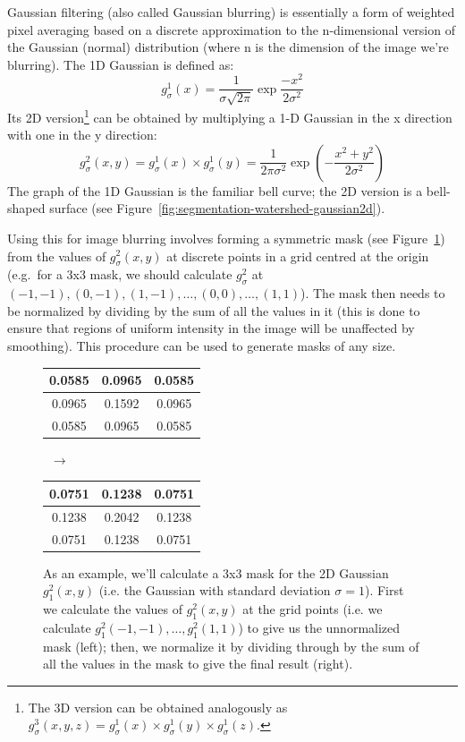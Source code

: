 Gaussian filtering (also called Gaussian blurring) is essentially a form of weighted pixel averaging based on a discrete approximation to the n-dimensional version of the Gaussian (normal) distribution (where n is the dimension of the image we're blurring). The 1D Gaussian is defined as:
%
\[
g_\sigma^1(x) = \frac{1}{\sigma\sqrt{2\pi}} \exp \frac{-x^2}{2\sigma^2}
\]
%
Its 2D version\footnote{The 3D version can be obtained analogously as $g_\sigma^3(x,y,z) = g_\sigma^1(x) \times g_\sigma^1(y) \times g_\sigma^1(z)$.} can be obtained by multiplying a 1-D Gaussian in the x direction with one in the y direction:
%
\[
g_\sigma^2(x,y) = g_\sigma^1(x) \times g_\sigma^1(y) = \frac{1}{2\pi\sigma^2} \exp \left( -\frac{x^2+y^2}{2\sigma^2} \right)
\]
%
The graph of the 1D Gaussian is the familiar bell curve; the 2D version is a bell-shaped surface (see Figure~\ref{fig:segmentation-watershed-gaussian2d}).


Using this for image blurring involves forming a symmetric mask (see Figure~\ref{fig:segmentation-watershed-gaussianmask}) from the values of $g_\sigma^2(x,y)$ at discrete points in a grid centred at the origin (e.g.~for a 3x3 mask, we should calculate $g_\sigma^2$ at $(-1,-1), (0,-1), (1,-1), \ldots, (0,0), \ldots, (1,1)$). The mask then needs to be normalized by dividing by the sum of all the values in it (this is done to ensure that regions of uniform intensity in the image will be unaffected by smoothing). This procedure can be used to generate masks of any size.

\begin{figure}[t]
\begin{center}
\begin{tabular}{|c|c|c|}
\hline
0.0585 & 0.0965 & 0.0585 \\
\hline
0.0965 & 0.1592 & 0.0965 \\
\hline
0.0585 & 0.0965 & 0.0585 \\
\hline
\end{tabular}%
$\;\; \longrightarrow \;\;$%
\begin{tabular}{|c|c|c|}
\hline
0.0751 & 0.1238 & 0.0751 \\
\hline
0.1238 & 0.2042 & 0.1238 \\
\hline
0.0751 & 0.1238 & 0.0751 \\
\hline
\end{tabular}
\end{center}
\caption{As an example, we'll calculate a 3x3 mask for the 2D Gaussian $g_1^2(x,y)$ (i.e. the Gaussian with standard deviation $\sigma = 1$). First we calculate the values of $g_1^2(x,y)$ at the grid points (i.e. we calculate $g_1^2(-1,-1), \ldots, g_1^2(1,1)$) to give us the unnormalized mask (left); then, we normalize it by dividing through by the sum of all the values in the mask to give the final result (right).}
\label{fig:segmentation-watershed-gaussianmask}
\end{figure}


